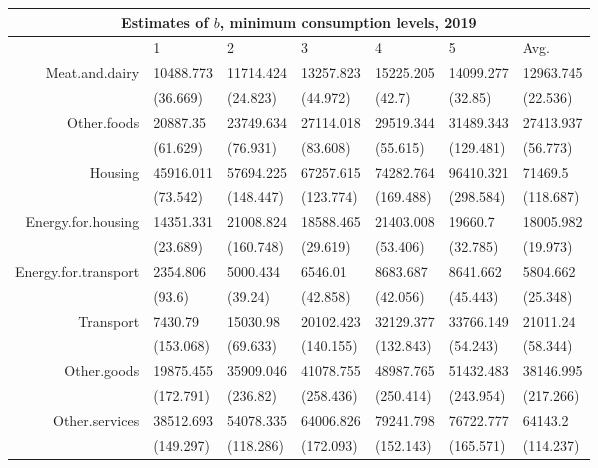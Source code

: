 \begin{tabular}{rllllll}
  \multicolumn{7}{c}{Estimates of $b$, minimum consumption levels, 2019} \\ 
  \hline
 & 1 & 2 & 3 & 4 & 5 & Avg. \\ 
  \hline
Meat.and.dairy & 10488.773 & 11714.424 & 13257.823 & 15225.205 & 14099.277 & 12963.745 \\ 
   & (36.669) & (24.823) & (44.972) & (42.7) & (32.85) & (22.536) \\ 
  Other.foods & 20887.35 & 23749.634 & 27114.018 & 29519.344 & 31489.343 & 27413.937 \\ 
   & (61.629) & (76.931) & (83.608) & (55.615) & (129.481) & (56.773) \\ 
  Housing & 45916.011 & 57694.225 & 67257.615 & 74282.764 & 96410.321 & 71469.5 \\ 
   & (73.542) & (148.447) & (123.774) & (169.488) & (298.584) & (118.687) \\ 
  Energy.for.housing & 14351.331 & 21008.824 & 18588.465 & 21403.008 & 19660.7 & 18005.982 \\ 
   & (23.689) & (160.748) & (29.619) & (53.406) & (32.785) & (19.973) \\ 
  Energy.for.transport & 2354.806 & 5000.434 & 6546.01 & 8683.687 & 8641.662 & 5804.662 \\ 
   & (93.6) & (39.24) & (42.858) & (42.056) & (45.443) & (25.348) \\ 
  Transport & 7430.79 & 15030.98 & 20102.423 & 32129.377 & 33766.149 & 21011.24 \\ 
   & (153.068) & (69.633) & (140.155) & (132.843) & (54.243) & (58.344) \\ 
  Other.goods & 19875.455 & 35909.046 & 41078.755 & 48987.765 & 51432.483 & 38146.995 \\ 
   & (172.791) & (236.82) & (258.436) & (250.414) & (243.954) & (217.266) \\ 
  Other.services & 38512.693 & 54078.335 & 64006.826 & 79241.798 & 76722.777 & 64143.2 \\ 
   & (149.297) & (118.286) & (172.093) & (152.143) & (165.571) & (114.237) \\ 
   \hline
\end{tabular}